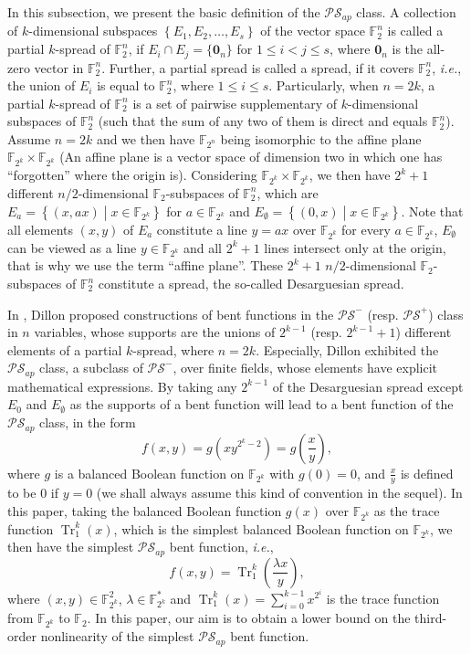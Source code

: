 \documentclass{article}
\newcommand{\F}{\mathbb{F}}
\newcommand{\0}{\textbf{0}}
\newcommand{\1}{\textbf{1}}
\newcommand{\TRACE}{\operatorname{Tr}_1^k}
\theoremstyle{plain}
\begin{document}
In this subsection, we present the basic definition of the $\mathcal{PS}_{ap}$ class.
A collection of $k$-dimensional subspaces $\left\{ E_1,E_2,\dots,E_s \right\}$ of the vector space $\F_2^n$ is called a partial $k$-spread of $\F_2^n$, 
if $E_i\cap E_j = \{\bm{0}_n\}$ for $1\le i<j\le s$, where $\bm{0}_n$ is the all-zero vector in $\F_2^n$.
Further, a partial spread is called a spread, if it covers $\F_2^n$, \emph{i.e.}, the union of $E_i$ is equal to $\F_2^n$, where $1\le i\le s$.
Particularly, when $n=2k$, a partial $k$-spread of $\F_2^n$ is a set of pairwise supplementary of $k$-dimensional subspaces of $\F_2^n$ (such that the sum of any two of them is direct and equals $\F_2^n$).
Assume $n=2k$ and we then have $\F_{2^n}$ being isomorphic to the affine plane $\F_{2^k}\times\F_{2^k}$ (An affine plane is a vector space of dimension two in which one has ``forgotten'' where the origin is).
Considering $\F_{2^k}\times\F_{2^k}$, we then have $2^k+1$ different $n/2$-dimensional $\F_2$-subspaces of $\F_2^n$, which are $E_a=\left\{(x,ax)\middle| x\in\F_{2^k}\right\}$ for $a\in\F_{2^k}$ and $E_{\emptyset}=\left\{(0,x)\middle| x\in\F_{2^k}\right\}$.
Note that all elements $(x,y)$ of $E_a$ constitute a line $y=ax$ over $\F_{2^k}$ for every $a\in\F_{2^k}$, $E_{\emptyset}$ can be viewed as a line $y\in\F_{2^k}$ and all $2^k+1$ lines intersect only at the origin, that is why we use the term ``affine plane''.
These $2^k+1$ $n/2$-dimensional $\F_2$-subspaces of $\F_2^n$ constitute a spread, the so-called Desarguesian spread. 

In \cite{Dillon1974PSbent}, Dillon proposed constructions of bent functions in the $\mathcal{PS}^-$ (resp. $\mathcal{PS}^+$) class in $n$ variables, whose supports are the unions of $2^{k-1}$ (resp. $2^{k-1}+1$) different elements of a partial $k$-spread, where $n=2k$.
Especially, Dillon exhibited the $\mathcal{PS}_{ap}$ class, a subclass of $\mathcal{PS}^-$, over finite fields, whose elements have explicit mathematical expressions.
By taking any $2^{k-1}$ of the Desarguesian spread except $E_0$ and $E_{\emptyset}$ as the supports of a bent function will lead to a bent function of the $\mathcal{PS}_{ap}$ class, in the form
    \begin{equation*}\label{Eqn_PS_bent}
        f(x,y)=g\left(xy^{2^k-2}\right)=g\left(\frac{x}{y}\right),
    \end{equation*}
    where $g$ is a balanced Boolean function on $\F_{2^{k}}$ with $g(0)=0$, and $\frac{x}{y}$ is defined to be $0$ if $y=0$ (we shall always assume this kind of convention in the sequel).
    In this paper, taking the balanced Boolean function $g(x)$ over $\F_{2^k}$ as the trace function $\TRACE(x)$, which is the simplest balanced Boolean function on $\F_{2^k}$, we then have the simplest
    $\mathcal{PS}_{ap}$ bent function, \emph{i.e.},
    \begin{equation*}\label{sub-bent}
        f(x,y)=\TRACE\left(\frac{\lambda x}{y}\right),
    \end{equation*}
    where $(x,y)\in\F_{2^k}^2$, $\lambda\in\F_{2^k}^{*}$ and $\TRACE(x)=\sum\limits_{i=0}^{k-1}x^{2^i}$ is the trace function from $\F_{2^k}$ to $\F_2$.
   In  this paper, our aim is to obtain a lower bound on the third-order nonlinearity of the simplest $\mathcal{PS}_{ap}$ bent function.
\end{document}
